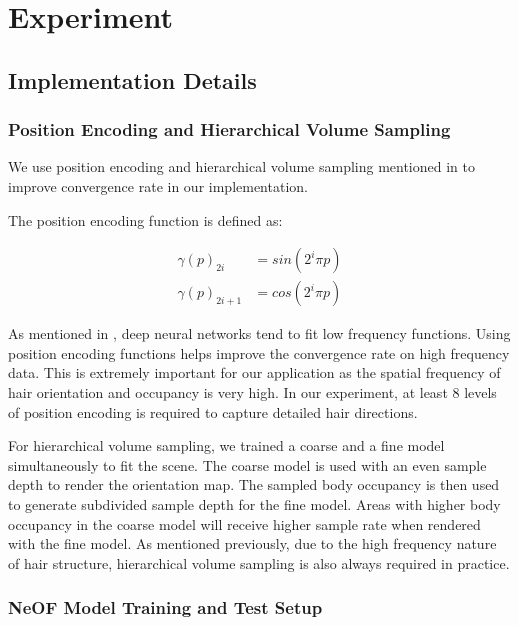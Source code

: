 \documentclass[12pt]{article}
\begin{document}
\section{Experiment}


\subsection{Implementation Details}

\subsubsection{Position Encoding and Hierarchical Volume Sampling}

We use position encoding and hierarchical volume sampling mentioned in \cite{mildenhall_nerf_2020} to improve convergence rate in our implementation.

The position encoding function is defined as:

\begin{align}
    \gamma(p)_{2i} &= sin(2^{i} \pi p) \\
    \gamma(p)_{2i + 1} &= cos(2^{i} \pi p)
\end{align}

As mentioned in \cite{mildenhall_nerf_2020}, deep neural networks tend to fit low frequency functions. Using position encoding functions helps improve the convergence rate on high frequency data. This is extremely important for our application as the spatial frequency of hair orientation and occupancy is very high. In our experiment, at least 8 levels of position encoding is required to capture detailed hair directions.

For hierarchical volume sampling, we trained a coarse and a fine model simultaneously to fit the scene. The coarse model is used with an even sample depth to render the orientation map. The sampled body occupancy is then used to generate subdivided sample depth for the fine model. Areas with higher body occupancy in the coarse model will receive higher sample rate when rendered with the fine model. As mentioned previously, due to the high frequency nature of hair structure, hierarchical volume sampling is also always required in practice.

\subsubsection{NeOF Model Training and Test Setup}
\end{document}
